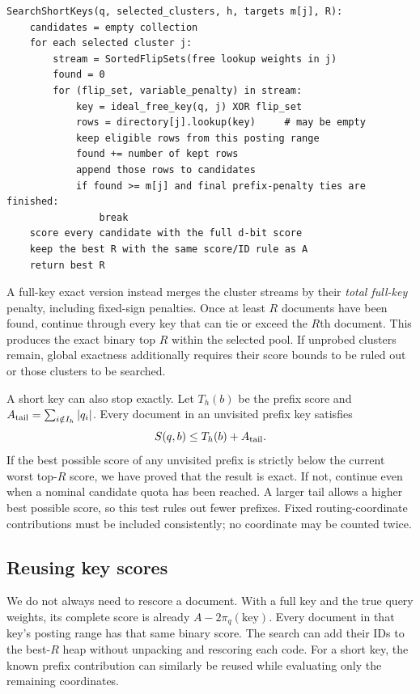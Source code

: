 \par\noindent\begin{minipage}{\linewidth}
\begin{lstlisting}[caption={Short-key candidate search with explicit per-cluster targets.}]
SearchShortKeys(q, selected_clusters, h, targets m[j], R):
    candidates = empty collection
    for each selected cluster j:
        stream = SortedFlipSets(free lookup weights in j)
        found = 0
        for (flip_set, variable_penalty) in stream:
            key = ideal_free_key(q, j) XOR flip_set
            rows = directory[j].lookup(key)     # may be empty
            keep eligible rows from this posting range
            found += number of kept rows
            append those rows to candidates
            if found >= m[j] and final prefix-penalty ties are finished:
                break
    score every candidate with the full d-bit score
    keep the best R with the same score/ID rule as A
    return best R
\end{lstlisting}
\end{minipage}\par

A full-key exact version instead merges the cluster streams by their \emph{total full-key}
penalty, including fixed-sign penalties. Once at least $R$ documents have been found, continue
through every key that can tie or exceed the $R$th document. This produces the exact binary
top $R$ within the selected pool. If unprobed clusters remain, global exactness additionally
requires their score bounds to be ruled out or those clusters to be searched.

A short key can also stop exactly. Let $T_h(b)$ be the prefix score and
$A_{\rm tail}=\sum_{i\notin I_h}|q_i|$. Every document in an unvisited prefix key satisfies
\begin{equation}
S(q,b)\leq T_h(b)+A_{\rm tail}.
\label{eq:prefix-bound}
\end{equation}
If the best possible score of any unvisited prefix is strictly below the current worst
top-$R$ score, we have proved that the result is exact. If not, continue even when a nominal candidate quota has been reached.
A larger tail allows a higher best possible score, so this test rules out fewer prefixes. Fixed routing-coordinate contributions must be
included consistently; no coordinate may be counted twice.

\subsection{Reusing key scores}
We do not always need to rescore a document. With a full key and the true query weights,
its complete score is already
$A-2\pi_q(\text{key})$. Every document in that key's posting range has that same binary score.
The search can add their IDs to the best-$R$ heap without unpacking and rescoring each code.
For a short key, the known prefix contribution can similarly be reused while evaluating
only the remaining coordinates.

